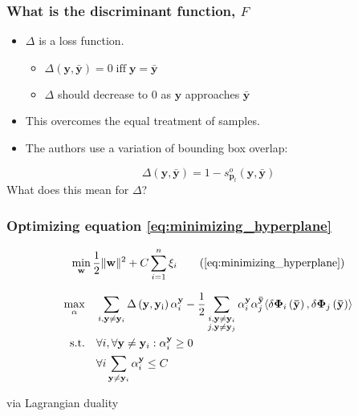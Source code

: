 \begin{frame}
    \frametitle{What is the discriminant function, \(F\)}
    \begin{itemize}
        \item \(\Delta\) is a loss function.
            \begin{itemize}
                \item \(\Delta (\mathbf{y}, \mathbf{\bar{y}}) = 0 \; \text{iff} \; \mathbf{y} = \mathbf{\bar{y}}\)
                \item \(\Delta\) should decrease to 0 as \(\mathbf{y}\) approaches \(\mathbf{\bar{y}}\)
            \end{itemize}
        \item This overcomes the equal treatment of samples.
        \item The authors use a variation of bounding box overlap:
    \end{itemize}
    \begin{equation}
        \Delta(\mathbf{y}, \mathbf{\bar{y}}) = 1 - s_{\mathbf{p}_t}^o (\mathbf{y}, \mathbf{\bar{y}})
    \end{equation}
    \alert{What does this mean for \(\Delta\)?}
\end{frame}

\begin{frame}
    \frametitle{Optimizing equation \eqref{eq:minimizing_hyperplane}}
    \begin{equation}
        \min_{\mathbf{w}} \frac{1}{2} \|\mathbf{w}\|^2 + C \sum_{i=1}^n \xi_i \tag{\ref{eq:minimizing_hyperplane}}
    \end{equation}

    \begin{equation}
        \begin{aligned}
            \max_{\alpha} \quad & \sum_{i, \mathbf{y} \ne \mathbf{y}_i} \operatorname{\Delta \left( \mathbf{y}, \mathbf{y}_i \right)} \alpha_i^\mathbf{y} -
                \frac{1}{2} \sum_{\substack{i, \mathbf{y} \ne \mathbf{y}_i \\ j, \mathbf{y} \ne \mathbf{y}_j}}
                \alpha_i^\mathbf{y} \alpha_j^\mathbf{\bar{y}} \langle \delta \mathbf{\Phi}_i \left( \mathbf{\bar{y}} \right),
                \delta \mathbf{\Phi}_j \left( \mathbf{\bar{y}} \right) \rangle \\
            \operatorname{\text{s.t.} \quad} & \forall i, \forall \mathbf{y} \ne \mathbf{y}_i : \alpha_i^\mathbf{y} \ge 0 \\
                & \forall i \sum_{\mathbf{y} \ne \mathbf{y}_i} \alpha_i^\mathbf{y} \le C
        \end{aligned}
    \end{equation}

    via Lagrangian duality
\end{frame}


